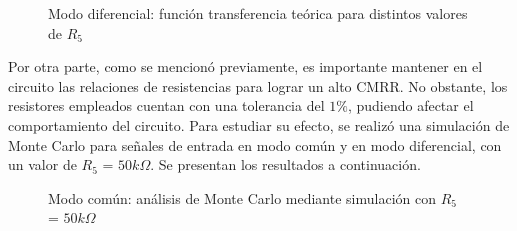   \begin{figure}[H]
    \centering
    \hfill
    \caption{Modo diferencial: función transferencia teórica para distintos valores de $R_{5}$}
  \end{figure}


Por otra parte, como se mencionó previamente, es importante mantener en el circuito las relaciones de resistencias para lograr un alto CMRR. No obstante, los resistores empleados cuentan con una tolerancia del $1\%$, 
pudiendo afectar el comportamiento del circuito. Para estudiar su efecto, se realizó una simulación de Monte Carlo para señales de entrada en modo común y en modo diferencial, con un valor de $R_{5}$ = $50k\Omega$.
Se presentan los resultados a continuación.

\begin{figure}[H]
    \centering
    \hfill
    \caption{Modo común: análisis de Monte Carlo mediante simulación con $R_{5}$ = $50k\Omega$}
  \end{figure}
  
